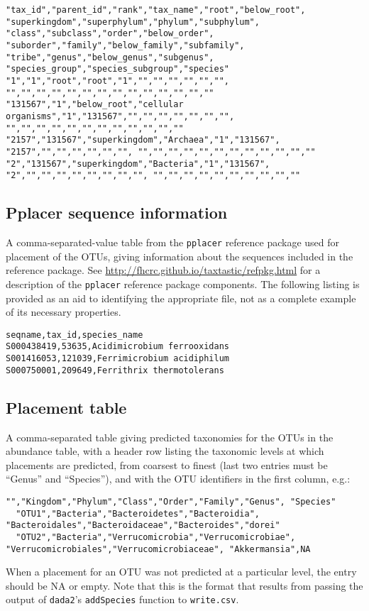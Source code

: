 \documentclass[12pt]{report}
\begin{document}
\begin{lstlisting}[caption=Beginning of an example taxonomy table file]
"tax_id","parent_id","rank","tax_name","root","below_root", "superkingdom","superphylum","phylum","subphylum", "class","subclass","order","below_order", "suborder","family","below_family","subfamily", "tribe","genus","below_genus","subgenus", "species_group","species_subgroup","species"
"1","1","root","root","1","","","","","","", "","","","","","","","","","","","","",""
"131567","1","below_root","cellular organisms","1","131567","","","","","","","", "","","","","","","","","","","",""
"2157","131567","superkingdom","Archaea","1","131567", "2157","","","","","","", "","","","","","","","","","","",""
"2","131567","superkingdom","Bacteria","1","131567", "2","","","","","","","","", "","","","","","","","","",""
\end{lstlisting}

\subsection{Pplacer sequence information}\label{pplacer_seq_info}
A comma-separated-value table from the \texttt{pplacer}
reference package used for placement of the OTUs, giving information
about the sequences included in the reference package. See 
\url{http://fhcrc.github.io/taxtastic/refpkg.html} for a description
of the \texttt{pplacer} reference package components.
The following
listing is provided as an aid to identifying the appropriate file, not
as a complete example of its necessary properties. 
\begin{lstlisting}[caption=Beginning of an example sequence information file]
seqname,tax_id,species_name
S000438419,53635,Acidimicrobium ferrooxidans
S001416053,121039,Ferrimicrobium acidiphilum
S000750001,209649,Ferrithrix thermotolerans
\end{lstlisting}

\subsection{Placement table}\label{placement_table}
A comma-separated table giving predicted taxonomies for the OTUs in
the abundance table, with a header row listing the taxonomic
levels at which placements are predicted, from coarsest to finest (last two entries must be ``Genus''
and ``Species''), and with the OTU identifiers in the first column, e.g.:
\begin{lstlisting}[caption=Example placement table]
  "","Kingdom","Phylum","Class","Order","Family","Genus", "Species"
  "OTU1","Bacteria","Bacteroidetes","Bacteroidia", "Bacteroidales","Bacteroidaceae","Bacteroides","dorei"
  "OTU2","Bacteria","Verrucomicrobia","Verrucomicrobiae", "Verrucomicrobiales","Verrucomicrobiaceae", "Akkermansia",NA
\end{lstlisting}
When a placement for an OTU was not predicted at a particular level,
the entry should be NA or empty.  Note that this is the format that
results from passing the output of \texttt{dada2}'s
\texttt{addSpecies} function to \texttt{write.csv}.
\end{document}
